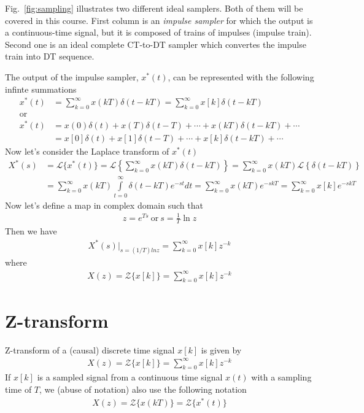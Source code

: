 \documentclass[twoside]{article}
\begin{document}
Fig.~\ref{fig:sampling} illustrates two different ideal samplers. Both
of them will be covered in this course. First column is an
\textit{impulse sampler} for which the output is a continuous-time signal,
but it is composed of trains of impulses (impulse train). Second one
is an ideal complete CT-to-DT sampler which convertes the impulse train
into DT sequence.

The output of the impulse sampler, $x^*(t)$, can be represented with
the following infinte summations
%
\begin{align*}
  x^*(t) &= \sum\limits_{k=0}^{\infty} x(kT) \delta(t - kT) =
          \sum\limits_{k=0}^{\infty} x[k] \delta(t - kT) 
\\ \mathrm{or}& \\
  x^*(t) &= x(0) \delta(t) + x(T) \delta(t - T) + \cdots +
 x(k T) \delta(t - kT) + \cdots \\
&= x[0] \delta(t) + x[1] \delta(t - T) + \cdots +
 x[k] \delta(t - kT) + \cdots 
\end{align*}
Now let's consider the Laplace transform of $x^*(t)$
%
\begin{align*}
  X^*(s) &= \mathcal{L} \lbrace x^*(t) \rbrace = \mathcal{L}
  \left\lbrace \sum\limits_{k=0}^{\infty} x(kT) \delta(t - kT)
  \right\rbrace
= \sum\limits_{k=0}^{\infty} x(kT) \mathcal{L}
  \left\lbrace \delta(t - kT)
  \right\rbrace 
\\
  &= \sum\limits_{k=0}^{\infty} x(kT) 
  \int\limits_{t=0}^{\infty} \delta(t - kT) e^{-s t} dt
    = \sum\limits_{k=0}^{\infty} x(kT) e^{-s kT}
 = \sum\limits_{k=0}^{\infty} x[k] e^{-s kT}
\end{align*}
%
Now let's define a map in complex domain
such that 
%
\begin{align*}
z = e^{Ts} \ \mathrm{or} \ s = \frac{1}{T} \ln z
\end{align*}
%
Then we have
%
\begin{align*}
  X^*(s)|_{s = (1/T) ln z} = \sum\limits_{k=0}^{\infty} x[k] z^{-k} 
\end{align*}
%
where 
%
\begin{align*}
  X(z) = \mathcal{Z} \lbrace x[k] \rbrace = \sum\limits_{k=0}^{\infty} x[k] z^{-k} 
\end{align*}

\section*{Z-transform}
%
Z-transform of a (causal) discrete time signal $x[k]$ is given by 
%
\begin{align*}
  X(z) = \mathcal{Z} \lbrace x[k] \rbrace = \sum\limits_{k=0}^{\infty} x[k] z^{-k} 
\end{align*}
%
If $x[k]$ is a sampled signal from a continuous time signal $x(t)$
with a sampling time of $T$, we (abuse of notation) also use the
following notation
%
\begin{align*}
  X(z) = \mathcal{Z} \lbrace x(kT) \rbrace = \mathcal{Z} \lbrace x^*(t) \rbrace 
\end{align*}
% 
\end{document}
